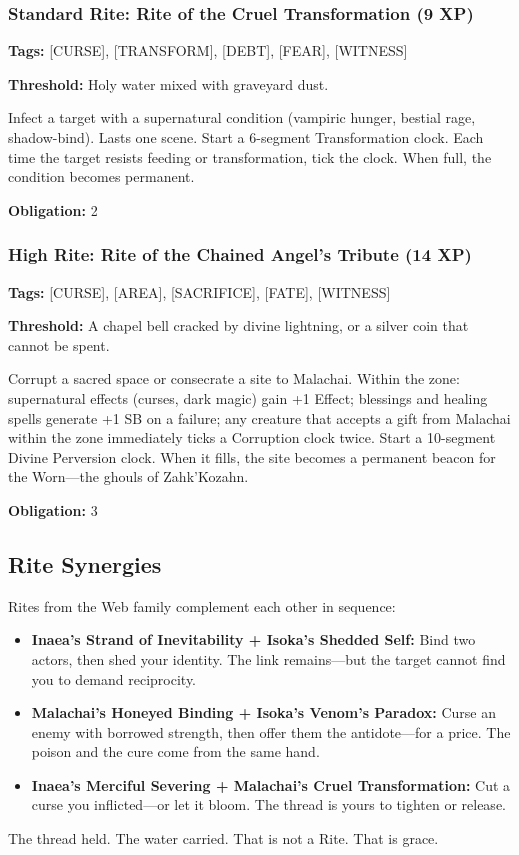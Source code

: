 \subsubsection{Standard Rite: Rite of the Cruel Transformation (9 XP)}

\textbf{Tags:} [CURSE], [TRANSFORM], [DEBT], [FEAR], [WITNESS]

\textbf{Threshold:} Holy water mixed with graveyard dust.

Infect a target with a supernatural condition (vampiric hunger, bestial rage, shadow-bind). Lasts one scene. Start a 6-segment Transformation clock. Each time the target resists feeding or transformation, tick the clock. When full, the condition becomes permanent.

\textbf{Obligation:} 2

\subsubsection{High Rite: Rite of the Chained Angel's Tribute (14 XP)}

\textbf{Tags:} [CURSE], [AREA], [SACRIFICE], [FATE], [WITNESS]

\textbf{Threshold:} A chapel bell cracked by divine lightning, or a silver coin that cannot be spent.

Corrupt a sacred space or consecrate a site to Malachai. Within the zone: supernatural effects (curses, dark magic) gain +1 Effect; blessings and healing spells generate +1 SB on a failure; any creature that accepts a gift from Malachai within the zone immediately ticks a Corruption clock twice. Start a 10-segment Divine Perversion clock. When it fills, the site becomes a permanent beacon for the Worn—the ghouls of Zahk'Kozahn.

\textbf{Obligation:} 3

\subsection{Rite Synergies}

Rites from the Web family complement each other in sequence:

\begin{itemize}
\item \textbf{Inaea's Strand of Inevitability + Isoka's Shedded Self:} Bind two actors, then shed your identity. The link remains—but the target cannot find you to demand reciprocity.
\item \textbf{Malachai's Honeyed Binding + Isoka's Venom's Paradox:} Curse an enemy with borrowed strength, then offer them the antidote—for a price. The poison and the cure come from the same hand.
\item \textbf{Inaea's Merciful Severing + Malachai's Cruel Transformation:} Cut a curse you inflicted—or let it bloom. The thread is yours to tighten or release.
\end{itemize}

The thread held. The water carried. That is not a Rite. That is grace.
